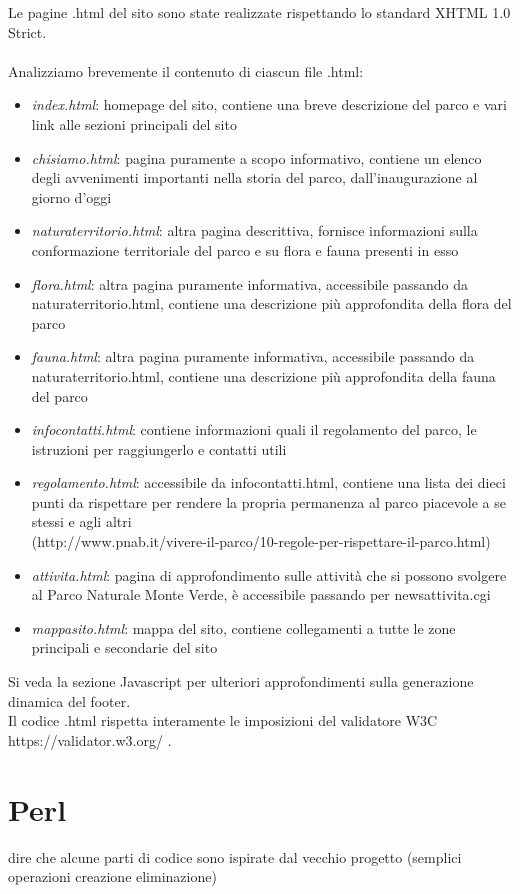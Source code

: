 \documentclass[12pt]{article}
\begin{document}
Le pagine .html del sito sono state realizzate rispettando lo standard XHTML 1.0 Strict.\\ \\
Analizziamo brevemente il contenuto di ciascun file .html:
\begin{itemize}
\item \textit{index.html}: homepage del sito, contiene una breve descrizione del parco e vari link alle sezioni principali del sito
\item \textit{chisiamo.html}:  pagina puramente a scopo informativo, contiene un elenco degli avvenimenti importanti nella storia del parco, dall'inaugurazione al giorno d'oggi
\item \textit{naturaterritorio.html}:  altra pagina descrittiva, fornisce informazioni sulla conformazione territoriale del parco e su flora e fauna presenti in esso
\item \textit{flora.html}: altra pagina puramente informativa, accessibile passando da naturaterritorio.html, contiene una descrizione più approfondita della flora del parco
\item \textit{fauna.html}: altra pagina puramente informativa, accessibile passando da naturaterritorio.html, contiene una descrizione più approfondita della fauna del parco
\item \textit{infocontatti.html}: contiene informazioni quali il regolamento del parco, le istruzioni per raggiungerlo e contatti utili
\item \textit{regolamento.html}: accessibile da infocontatti.html, contiene una lista dei dieci punti da rispettare per rendere la propria permanenza al parco piacevole a se stessi e agli altri\\ (http://www.pnab.it/vivere-il-parco/10-regole-per-rispettare-il-parco.html)
\item \textit{attivita.html}: pagina di approfondimento sulle attività che si possono svolgere al Parco Naturale Monte Verde, è accessibile passando per newsattivita.cgi
\item \textit{mappasito.html}: mappa del sito, contiene collegamenti a tutte le zone principali e secondarie del sito
\end{itemize}
Si veda la sezione Javascript per ulteriori approfondimenti sulla generazione dinamica del footer.\\
Il codice .html rispetta interamente le imposizioni del validatore W3C https://validator.w3.org/ .

			\section{Perl} dire che alcune parti di codice sono ispirate dal vecchio progetto (semplici operazioni creazione eliminazione)
		
\end{document}
